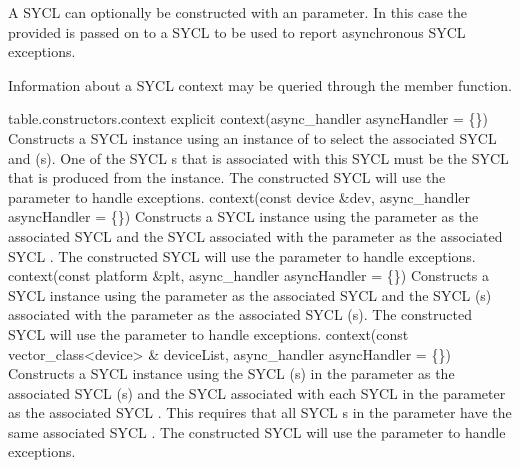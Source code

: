 A SYCL  can optionally be constructed with an  parameter. In this case the  provided is passed on to a SYCL  to be used to report asynchronous SYCL exceptions.

Information about a SYCL \gls{context} may be queried through the 
member function.



 {table.constructors.context}
  \addRow
  {explicit context(async_handler asyncHandler = \{\})}
  {
    Constructs a SYCL  instance using an instance of  to select the associated SYCL  and (s). One of the SYCL s that is associated with this SYCL  must be the SYCL  that is produced from the  instance. The constructed SYCL  will use the  parameter to handle exceptions.
  }
  \addRowTwoL
  {context(const device \&dev,}
  {async_handler asyncHandler = \{\})}
  {
     Constructs a SYCL  instance using the  parameter as the associated SYCL  and the SYCL  associated with the  parameter as the associated SYCL . The constructed SYCL  will use the  parameter to handle exceptions.
  }
  \addRowTwoL
  {context(const platform \&plt,}
  {async_handler asyncHandler = \{\})}
  {
     Constructs a SYCL  instance using the  parameter as the associated SYCL  and the SYCL (s) associated with the  parameter as the associated SYCL (s). The constructed SYCL  will use the  parameter to handle exceptions.
  }   
  \addRowTwoL
  {context(const vector_class<device> \& deviceList,}
  {async_handler asyncHandler = \{\})}
  {
     Constructs a SYCL  instance using the SYCL (s) in the  parameter as the associated SYCL (s) and the SYCL  associated with each SYCL  in the  parameter as the associated SYCL . This requires that all SYCL s in the  parameter have the same associated SYCL . The constructed SYCL  will use the  parameter to handle exceptions.
  } 
